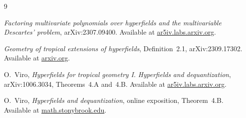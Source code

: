 \documentclass[11pt]{article}
\begin{document}
\begin{thebibliography}{9}

\emph{Factoring multivariate polynomials over hyperfields and the
multivariable Descartes' problem}, arXiv:2307.09400.
Available at
\href{https://ar5iv.labs.arxiv.org/html/2307.09400}{ar5iv.labs.arxiv.org}.

\emph{Geometry of tropical extensions of hyperfields}, Definition~2.1,
arXiv:2309.17302.
Available at
\href{https://arxiv.org/html/2309.17302}{arxiv.org}.

O.~Viro,
\emph{Hyperfields for tropical geometry I. Hyperfields and dequantization},
arXiv:1006.3034, Theorems~4.A and~4.B.
Available at
\href{https://ar5iv.labs.arxiv.org/html/1006.3034}{ar5iv.labs.arxiv.org}.

O.~Viro,
\emph{Hyperfields and dequantization}, online exposition, Theorem~4.B.
Available at
\href{https://www.math.stonybrook.edu/\%7Eoleg/VersoTeX/Show/Hyperfields/hf.html}{math.stonybrook.edu}.

\end{thebibliography}
\end{document}
